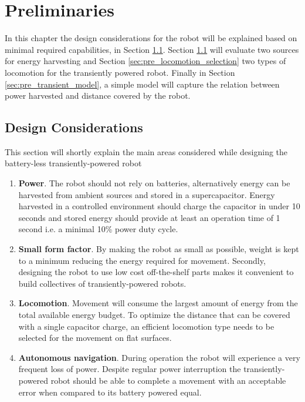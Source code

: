 \chapter{Preliminaries}
\label{cap:preliminaries}

In this chapter the design considerations for the robot will be explained based on minimal required capabilities, in Section \ref{sec:pre_design_considerations}.
Section \ref{sec:pre_design_considerations} will evaluate two sources for energy harvesting and Section \ref{sec:pre_locomotion_selection} two types of locomotion for the transiently powered robot.
Finally in Section \ref{sec:pre_transient_model}, a simple model will capture the relation between power harvested and distance covered by the robot.

\section{Design Considerations}
\label{sec:pre_design_considerations}

This section will shortly explain the main areas considered while designing the battery-less transiently-powered robot



\begin{enumerate}
	\item \textbf{Power}. 
	The robot should not rely on batteries, alternatively energy can be harvested from ambient sources and stored in a supercapacitor. 
	Energy harvested in a controlled environment should charge the capacitor in under 10 seconds and stored energy should provide at least an operation time of 1 second i.e. a minimal 10\% power duty cycle.
	
	\item \textbf{Small form factor}. 
	By making the robot as small as possible, weight is kept to a minimum reducing the energy required for movement.
	Secondly, designing the robot to use low cost off-the-shelf parts makes it convenient to build collectives of transiently-powered robots.
	
	\item \textbf{Locomotion}.
	Movement will consume the largest amount of energy from the total available energy budget.
	To optimize the distance that can be covered with a single capacitor charge, an efficient locomotion type needs to be selected for the movement on flat surfaces.
	
	\item \textbf{Autonomous navigation}.
	During operation the robot will experience a very frequent loss of power. 
	Despite regular power interruption the transiently-powered robot should be able to complete a movement with an acceptable error when compared to its battery powered equal.
	
\end{enumerate}

